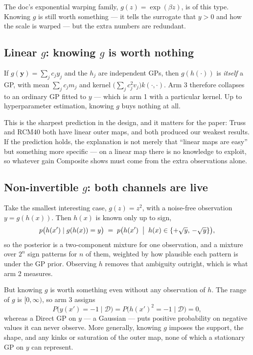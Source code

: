 \documentclass[11pt]{article}
\newcommand{\Data}{\mathcal{D}}
\begin{document}
The doc's exponential warping family, $g(z)=\exp(\beta z)$, is of this type.
Knowing $g$ is still worth something --- it tells the surrogate that $y>0$ and
how the scale is warped --- but the extra numbers are redundant.

\subsection{Linear $g$: knowing $g$ is worth nothing}

If $g(\mathbf{y})=\sum_j c_j y_j$ and the $h_j$ are independent GPs, then
$g(h(\cdot))$ is \emph{itself} a GP, with mean $\sum_j c_jm_j$ and kernel
$\bigl(\sum_j c_j^2 v_j\bigr)k(\cdot,\cdot)$. Arm 3 therefore collapses to an
ordinary GP fitted to $y$ --- which is arm 1 with a particular kernel. Up to
hyperparameter estimation, knowing $g$ buys nothing at all.

This is the sharpest prediction in the design, and it matters for the paper:
Truss and RCM40 both have linear outer maps, and both produced our weakest
results. If the prediction holds, the explanation is not merely that ``linear
maps are easy'' but something more specific --- on a linear map there is no
knowledge to exploit, so whatever gain Composite shows must come from the extra
observations alone.

\subsection{Non-invertible $g$: both channels are live}

Take the smallest interesting case, $g(z)=z^2$, with a noise-free observation
$y=g(h(x))$. Then $h(x)$ is known only up to sign,
\begin{equation}
p\bigl(h(x')\mid g(h(x))=y\bigr)
\;=\;p\bigl(h(x')\;\bigm|\;h(x)\in\{+\sqrt{y},\,-\sqrt{y}\}\bigr),
\label{eq:square}
\end{equation}
so the posterior is a two-component mixture for one observation, and a mixture
over $2^n$ sign patterns for $n$ of them, weighted by how plausible each pattern
is under the GP prior. Observing $h$ removes that ambiguity outright, which is
what arm 2 measures.

But knowing $g$ is worth something even without any observation of $h$. The
range of $g$ is $[0,\infty)$, so arm 3 assigns
\begin{equation}
P\bigl(y(x')=-1\mid\Data\bigr)=P\bigl(h(x')^2=-1\mid\Data\bigr)=0 ,
\end{equation}
whereas a Direct GP on $y$ --- a Gaussian --- puts positive probability on
negative values it can never observe. More generally, knowing $g$ imposes the
support, the shape, and any kinks or saturation of the outer map, none of which
a stationary GP on $y$ can represent.
\end{document}
